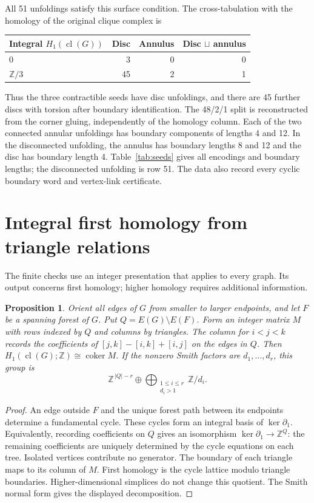 \documentclass[11pt]{amsart}
\newcommand{\ZZ}{\mathbb Z}
\newcommand{\cl}{\operatorname{cl}}
\newtheorem{proposition}[theorem]{Proposition}
\theoremstyle{definition}
\begin{document}
All 51 unfoldings satisfy this surface condition. The cross-tabulation
with the homology of the original clique complex is
\begin{center}
\begin{tabular}{lrrr}
\toprule
Integral $H_1(\cl(G))$ &Disc&Annulus&Disc $\sqcup$ annulus\\
\midrule
$0$&3&0&0\\
$\ZZ/3$&45&2&1\\
\bottomrule
\end{tabular}
\end{center}
Thus the three contractible seeds have disc unfoldings, and there
are 45 further discs with torsion after boundary identification.
The 48/2/1 split is reconstructed from the corner gluing,
independently of the homology column.
Each of the two connected annular unfoldings has boundary components
of lengths 4 and 12. In the disconnected
unfolding, the annulus has boundary lengths 8 and 12 and the disc has
boundary length 4. Table~\ref{tab:seeds} gives all encodings and
boundary lengths; the disconnected unfolding is row 51. The data also record every cyclic boundary word
and vertex-link certificate.

\section{Integral first homology from triangle relations}
The finite checks use an integer presentation that applies to every
graph. Its output concerns first homology; higher homology requires
additional information.

\begin{proposition}\label{prop:h1}
Orient all edges of $G$ from smaller to larger endpoints, and let $F$
be a spanning forest of $G$. Put $Q=E(G)\setminus E(F)$.
Form an integer matrix $M$ with rows indexed by $Q$ and columns by
triangles. The column for $i<j<k$ records the coefficients of
$[j,k]-[i,k]+[i,j]$ on the edges in $Q$.
Then $H_1(\cl(G);\ZZ)\cong\operatorname{coker}M$.
If the nonzero Smith factors are $d_1,\ldots,d_r$, this group is
\[
 \ZZ^{\,|Q|-r}\oplus
 \bigoplus_{\substack{1\leq i\leq r\\d_i>1}}\ZZ/d_i.
\]
\end{proposition}
\begin{proof}
An edge outside $F$ and the unique forest path between its endpoints
determine a fundamental cycle. These cycles form an integral basis
of $\ker\partial_1$. Equivalently, recording coefficients on $Q$
gives an isomorphism $\ker\partial_1\to\ZZ^Q$: the remaining
coefficients are uniquely determined by the cycle equations on
each tree. Isolated vertices contribute no generator.
The boundary of each triangle maps to its column of $M$.
First homology is the cycle lattice modulo triangle boundaries.
Higher-dimensional simplices do not change this quotient.
The Smith normal form gives the displayed decomposition.
\end{proof}
\end{document}
